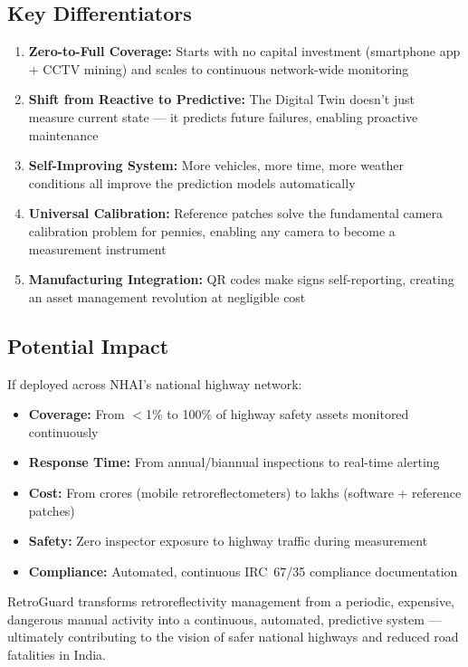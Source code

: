 \documentclass[11pt,a4paper]{article}
\begin{document}
\subsection{Key Differentiators}

\begin{enumerate}[noitemsep]
    \item \textbf{Zero-to-Full Coverage:} Starts with no capital investment (smartphone app + CCTV mining) and scales to continuous network-wide monitoring
    \item \textbf{Shift from Reactive to Predictive:} The Digital Twin doesn't just measure current state --- it predicts future failures, enabling proactive maintenance
    \item \textbf{Self-Improving System:} More vehicles, more time, more weather conditions all improve the prediction models automatically
    \item \textbf{Universal Calibration:} Reference patches solve the fundamental camera calibration problem for pennies, enabling any camera to become a measurement instrument
    \item \textbf{Manufacturing Integration:} QR codes make signs self-reporting, creating an asset management revolution at negligible cost
\end{enumerate}

\subsection{Potential Impact}

If deployed across NHAI's national highway network:

\begin{itemize}[noitemsep]
    \item \textbf{Coverage:} From $<$1\% to 100\% of highway safety assets monitored continuously
    \item \textbf{Response Time:} From annual/biannual inspections to real-time alerting
    \item \textbf{Cost:} From crores (mobile retroreflectometers) to lakhs (software + reference patches)
    \item \textbf{Safety:} Zero inspector exposure to highway traffic during measurement
    \item \textbf{Compliance:} Automated, continuous IRC~67/35 compliance documentation
\end{itemize}

RetroGuard transforms retroreflectivity management from a periodic, expensive, dangerous manual activity into a continuous, automated, predictive system --- ultimately contributing to the vision of safer national highways and reduced road fatalities in India.
\end{document}
